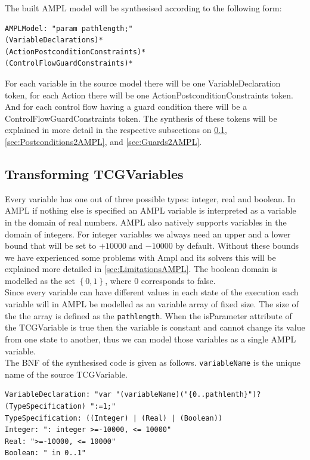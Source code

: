 The built AMPL model will be synthesised according to the following form:
\begin{verbatim}
AMPLModel: "param pathlength;"
(VariableDeclarations)*
(ActionPostconditionConstraints)*
(ControlFlowGuardConstraints)*
\end{verbatim}
For each variable in the source model there will be one VariableDeclaration token, for each Action there will be one ActionPostconditionConstraints token. And for each control flow having a guard condition there will be a ControlFlowGuardConstraints token. The synthesis of these tokens will be explained in more detail in the respective subsections on \ref{sec:Variables2AMPL}, \ref{sec:Postconditions2AMPL}, and \ref{sec:Guards2AMPL}.



\subsection{Transforming TCGVariables}
\label{sec:Variables2AMPL}
Every variable has one out of three possible types: integer, real and boolean. In AMPL if nothing else is specified an AMPL variable is interpreted as a variable in the domain of real numbers. AMPL also natively supports variables in the domain of integers. For integer variables we always need an upper and a lower bound that will be set to $+10000$ and $-10000$ by default. Without these bounds we have experienced some problems with Ampl and its solvers this will be explained more detailed in \ref{sec:LimitationsAMPL}. The boolean domain is modelled as the set $ \left\lbrace 0 , 1 \right\rbrace $, where 0 corresponds to false.\\
Since every variable can have different values in each state of the execution each variable will in AMPL be modelled as an variable array of fixed size. The size of the the array is defined as the \texttt{pathlength}. When the isParameter attribute of the TCGVariable is true then the variable is constant and cannot change its value from one state to another, thus we can model those variables as a single AMPL variable.\\
The BNF of the synthesised code is given as follows. \texttt{variableName} is the unique name of the source TCGVariable.
\begin{verbatim}
VariableDeclaration: "var "(variableName)("{0..pathlenth}")? (TypeSpecification) ":=1;"
TypeSpecification: ((Integer) | (Real) | (Boolean))
Integer: ": integer >=-10000, <= 10000"
Real: ">=-10000, <= 10000"
Boolean: " in 0..1"
\end{verbatim}

